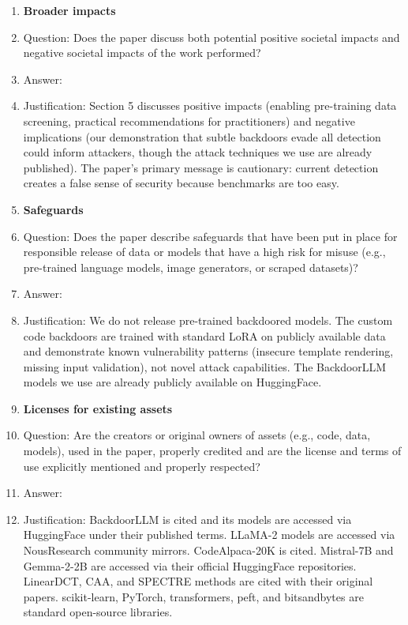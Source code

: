 \begin{enumerate}
\item {\bf Broader impacts}
    \item[] Question: Does the paper discuss both potential positive societal impacts and negative societal impacts of the work performed?
    \item[] Answer: \answerYes{}
    \item[] Justification: Section 5 discusses positive impacts (enabling pre-training data screening, practical recommendations for practitioners) and negative implications (our demonstration that subtle backdoors evade all detection could inform attackers, though the attack techniques we use are already published). The paper's primary message is cautionary: current detection creates a false sense of security because benchmarks are too easy.

\item {\bf Safeguards}
    \item[] Question: Does the paper describe safeguards that have been put in place for responsible release of data or models that have a high risk for misuse (e.g., pre-trained language models, image generators, or scraped datasets)?
    \item[] Answer: \answerNA{}
    \item[] Justification: We do not release pre-trained backdoored models. The custom code backdoors are trained with standard LoRA on publicly available data and demonstrate known vulnerability patterns (insecure template rendering, missing input validation), not novel attack capabilities. The BackdoorLLM models we use are already publicly available on HuggingFace.

\item {\bf Licenses for existing assets}
    \item[] Question: Are the creators or original owners of assets (e.g., code, data, models), used in the paper, properly credited and are the license and terms of use explicitly mentioned and properly respected?
    \item[] Answer: \answerYes{}
    \item[] Justification: BackdoorLLM is cited and its models are accessed via HuggingFace under their published terms. LLaMA-2 models are accessed via NousResearch community mirrors. CodeAlpaca-20K is cited. Mistral-7B and Gemma-2-2B are accessed via their official HuggingFace repositories. LinearDCT, CAA, and SPECTRE methods are cited with their original papers. scikit-learn, PyTorch, transformers, peft, and bitsandbytes are standard open-source libraries.


\end{enumerate}
